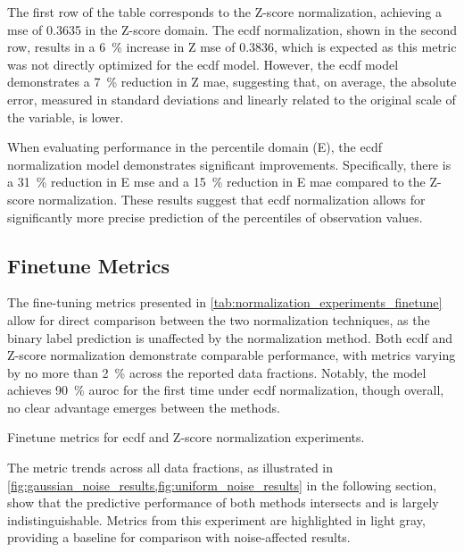 The first row of the table corresponds to the Z-score normalization, achieving a \gls{mse} of \num{0.3635} in the Z-score domain. The \gls{ecdf} normalization, shown in the second row, results in a \qty{6}{\percent} increase in Z \gls{mse} of \num{0.3836}, which is expected as this metric was not directly optimized for the \gls{ecdf} model. However, the \gls{ecdf} model demonstrates a \qty{7}{\percent} reduction in Z \gls{mae}, suggesting that, on average, the absolute error, measured in standard deviations and linearly related to the original scale of the variable, is lower.


When evaluating performance in the percentile domain (E), the \gls{ecdf} normalization model demonstrates significant improvements. Specifically, there is a \qty{31}{\percent} reduction in E \gls{mse} and a \qty{15}{\percent} reduction in E \gls{mae} compared to the Z-score normalization. These results suggest that \gls{ecdf} normalization allows for significantly more precise prediction of the percentiles of observation values.


\subsection{Finetune Metrics}


The fine-tuning metrics presented in \cref{tab:normalization_experiments_finetune} allow for direct comparison between the two normalization techniques, as the binary label prediction is unaffected by the normalization method. Both \gls{ecdf} and Z-score normalization demonstrate comparable performance, with metrics varying by no more than \qty{2}{\percent} across the reported data fractions. Notably, the model achieves \qty{90}{\percent} \gls{auroc} for the first time under \gls{ecdf} normalization, though overall, no clear advantage emerges between the methods.



\begin{table}

\caption{Finetune metrics for \gls{ecdf} and Z-score normalization experiments.}
\label{tab:normalization_experiments_finetune}
\end{table}

The metric trends across all data fractions, as illustrated in \cref{fig:gaussian_noise_results,fig:uniform_noise_results} in the following section, show that the predictive performance of both methods intersects and is largely indistinguishable. Metrics from this experiment are highlighted in light gray, providing a baseline for comparison with noise-affected results.


